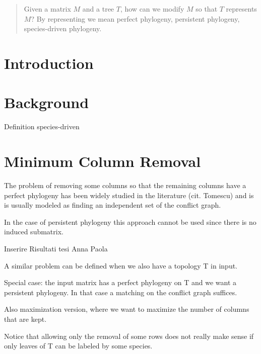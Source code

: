 \begin{abstract}
Given a matrix $M$ and a tree $T$, how can we modify $M$ so that $T$ represents $M$?
By representing we mean perfect phylogeny, persistent phylogeny, species-driven phylogeny.
\end{abstract}
 
 
\section{Introduction}
\section{Background}
Definition species-driven


\section{Minimum Column Removal}


The problem of removing some columns so that the remaining columns have a perfect phylogeny has been widely studied in the literature (cit. Tomescu) and is is usually modeled as finding an independent set of the conflict graph.

In the case of persistent phylogeny this approach cannot be used since there is no induced submatrix.

Inserire Risultati tesi Anna Paola

A similar problem can be defined when we also have a topology T in input.

Special case: the input matrix has a perfect phylogeny on T and we want a persistent phylogeny. In that case a matching on the conflict graph suffices.

Also maximization version, where we want to maximize the number of columns that are kept.

Notice that allowing only the removal of some rows does not really make sense if only leaves of T can be labeled by some species.
